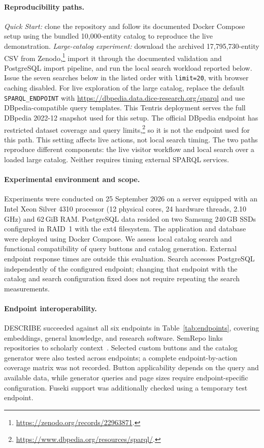 \paragraph{Reproducibility paths.}
\emph{Quick Start:} clone the repository and follow its documented Docker Compose setup using the bundled 10,000-entity catalog to reproduce the live demonstration. \emph{Large-catalog experiment:} download the archived 17,795,730-entity CSV from Zenodo,\footnote{\url{https://zenodo.org/records/22963871}.} import it through the documented validation and PostgreSQL import pipeline, and run the local search workload reported below. Issue the seven searches below in the listed order with \texttt{limit=20}, with browser caching disabled. For live exploration of the large catalog, replace the default \texttt{SPARQL\_ENDPOINT} with \url{https://dbpedia.data.dice-research.org/sparql} and use DBpedia-compatible query templates. This Tentris deployment serves the full DBpedia 2022-12 snapshot used for this setup. The official DBpedia endpoint has restricted dataset coverage and query limits,\footnote{\url{https://www.dbpedia.org/resources/sparql/}.} so it is not the endpoint used for this path. This setting affects live actions, not local search timing. The two paths reproduce different components: the live visitor workflow and local search over a loaded large catalog. Neither requires timing external SPARQL services.


\paragraph{Experimental environment and scope.}
Experiments were conducted on 25 September 2026 on a server equipped with an Intel Xeon Silver 4310 processor (12 physical cores, 24 hardware threads, 2.10\,GHz) and 62\,GiB RAM. PostgreSQL data resided on two Samsung 240\,GB SSDs configured in RAID~1 with the ext4 filesystem. The application and database were deployed using Docker Compose. We assess local catalog search and functional compatibility of query buttons and catalog generation. External endpoint response times are outside this evaluation. Search accesses PostgreSQL independently of the configured endpoint; changing that endpoint with the catalog and search configuration fixed does not require repeating the search measurements.

\paragraph{Endpoint interoperability.}
DESCRIBE succeeded against all six endpoints in Table~\ref{tab:endpoints}, covering embeddings, general knowledge, and research software. SemRepo links repositories to scholarly context~\cite{semrepo2026}. Selected custom buttons and the catalog generator were also tested across endpoints; a complete endpoint-by-action coverage matrix was not recorded. Button applicability depends on the query and available data, while generator queries and page sizes require endpoint-specific configuration. Fuseki support was additionally checked using a temporary test endpoint.

